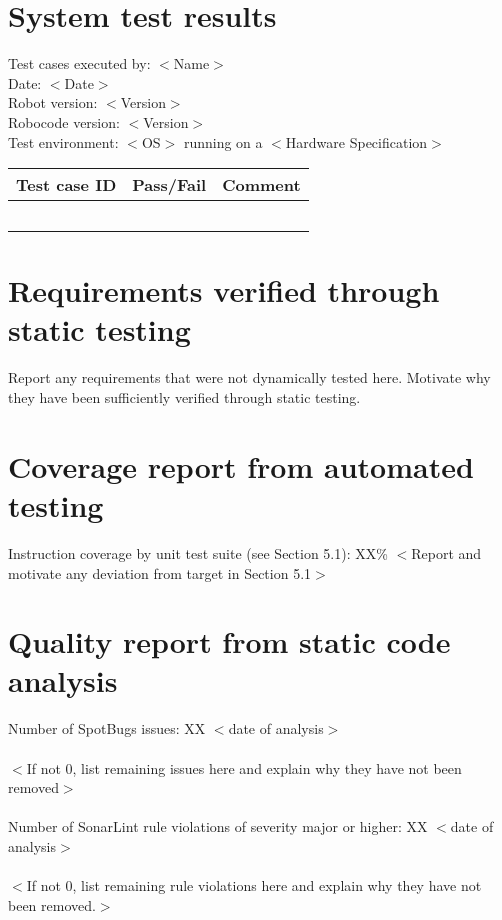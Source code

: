 \documentclass{scrreprt}
\begin{document}
\section{System test results}
Test cases executed by: $<$Name$>$\\
Date: $<$Date$>$\\
Robot version: $<$Version$>$\\
Robocode version: $<$Version$>$\\
Test environment: $<$OS$>$ running on a $<$Hardware Specification$>$

\begin{center}
    \begin{tabular}{|c|c|c|}
        \hline
	    Test case ID & Pass/Fail & Comment\\
        \hline
	     &  &  \\
        \hline
	     &  &  \\
        \hline
         &  &  \\
        \hline
         &  &  \\
        \hline
         &  &  \\
        \hline
        
    \end{tabular}
\end{center}

\section{Requirements verified through static testing}
Report any requirements that were not dynamically tested here. Motivate why they have been sufficiently verified through static testing.

\section{Coverage report from automated testing}
Instruction coverage by unit test suite (see Section 5.1): XX\%
$<$Report and motivate any deviation from target in Section 5.1$>$

\section{Quality report from static code analysis}

Number of SpotBugs issues: XX $<$date of analysis$>$\\
\\
$<$If not 0, list remaining issues here and explain why they have not been removed$>$\\
\\
Number of SonarLint rule violations of severity major or higher: XX $<$date of analysis$>$\\
\\
$<$If not 0, list remaining rule violations here and explain why they have not been removed.$>$\\
\\
\end{document}
